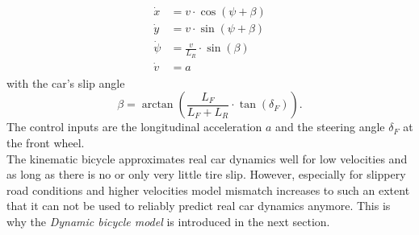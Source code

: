 \begin{align}
\begin{split}
    \dot x &= v \cdot \cos (\psi + \beta)\\
    \dot y &= v \cdot \sin (\psi + \beta)\\
    \dot \psi &= \frac{v}{L_R}\cdot\sin(\beta)\\
    \dot v &= a
\end{split}
\end{align}
with the car's slip angle
\begin{equation}
    \beta = \arctan\left(\frac{L_F}{L_F+L_R}\cdot \tan(\delta_F)\right).
\end{equation}
The control inputs are the longitudinal acceleration $a$ and the steering angle $\delta_F$ at the front wheel.\\
The kinematic bicycle approximates real car dynamics well for low velocities and as long as there is no or only very little tire slip. However, especially for slippery road conditions and higher velocities model mismatch increases to such an extent that it can not be used to reliably predict real car dynamics anymore. This is why the \emph{Dynamic bicycle model} is introduced in the next section.

